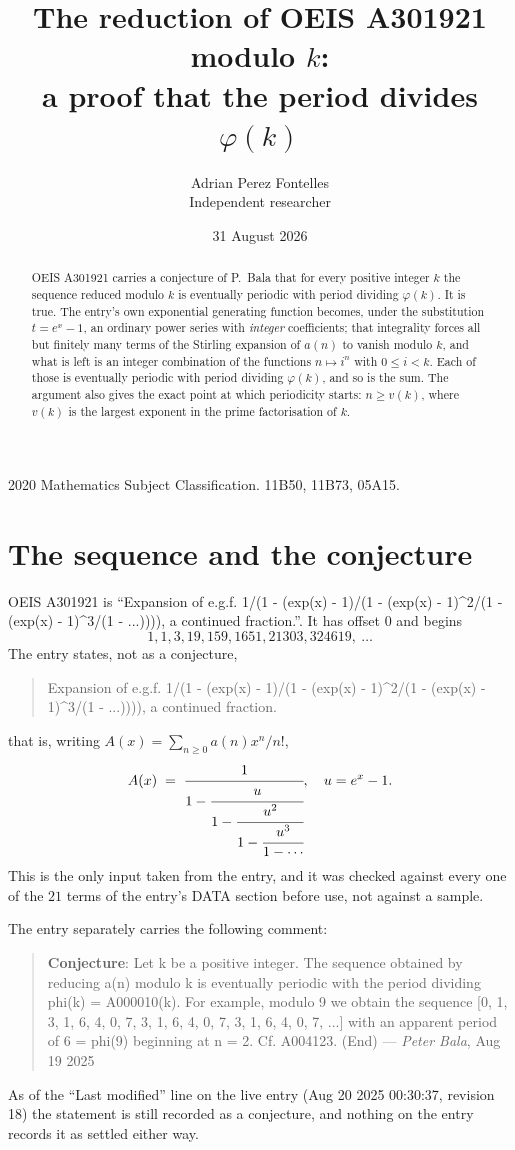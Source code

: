 \documentclass[11pt,a4paper]{article}
\title{The reduction of OEIS A301921 modulo $k$:\\ a proof that the period divides
$\varphi(k)$}
\author{Adrian Perez Fontelles\\ \small Independent researcher}
\date{31 August 2026}
\theoremstyle{plain}
\theoremstyle{definition}
\begin{document}
\maketitle

\begin{abstract}
OEIS A301921 carries a conjecture of P.~Bala that for every positive integer $k$ the
sequence reduced modulo $k$ is eventually periodic with period dividing $\varphi(k)$.
It is true. The entry's own exponential generating function becomes, under the
substitution $t=e^{x}-1$, an ordinary power series with \emph{integer} coefficients;
that integrality forces all but finitely many terms of the Stirling expansion of $a(n)$
to vanish modulo $k$, and what is left is an integer combination of the functions
$n\mapsto i^{n}$ with $0\le i<k$. Each of those is eventually periodic with period
dividing $\varphi(k)$, and so is the sum. The argument also gives the exact point at
which periodicity starts: $n\ge v(k)$, where $v(k)$ is the largest exponent in the
prime factorisation of $k$.
\end{abstract}

\noindent\small 2020 Mathematics Subject Classification. 11B50, 11B73, 05A15.\normalsize

\section{The sequence and the conjecture}

OEIS A301921 is ``Expansion of e.g.f. 1/(1 - (exp(x) - 1)/(1 - (exp(x) - 1)\^{}2/(1 - (exp(x) - 1)\^{}3/(1 - ...)))), a continued fraction.''. It has offset $0$ and begins
\[
1, 1, 3, 19, 159, 1651, 21303, 324619,\ \dots
\]
The entry states, not as a conjecture,
\begin{quote}\small
Expansion of e.g.f. 1/(1 - (exp(x) - 1)/(1 - (exp(x) - 1)\^{}2/(1 - (exp(x) - 1)\^{}3/(1 - ...)))), a continued fraction.
\end{quote}
that is, writing $A(x)=\sum_{n\ge 0}a(n)x^{n}/n!$,
\begin{equation}\label{eq:egf}
A(x)\;=\;\cfrac{1}{1-\cfrac{u}{1-\cfrac{u^{2}}{1-\cfrac{u^{3}}{1-\cdots}}}},\quad u=e^{x}-1.
\end{equation}
This is the only input taken from the entry, and it was checked against every one of the
$21$ terms of the entry's DATA section before use, not against a sample.

The entry separately carries the following comment:
\begin{quote}\small
\textbf{Conjecture}: Let k be a positive integer. The sequence obtained by reducing a(n) modulo k is eventually periodic with the period dividing phi(k) = A000010(k). For example, modulo 9 we obtain the sequence [0, 1, 3, 1, 6, 4, 0, 7, 3, 1, 6, 4, 0, 7, 3, 1, 6, 4, 0, 7, ...] with an apparent period of 6 = phi(9) beginning at n = 2. Cf. A004123. (End) --- \emph{Peter Bala}, Aug 19 2025
\end{quote}
As of the ``Last modified'' line on the live entry (Aug 20 2025 00:30:37, revision
18) the statement is still recorded as a conjecture, and nothing on the entry
records it as settled either way.
\end{document}
